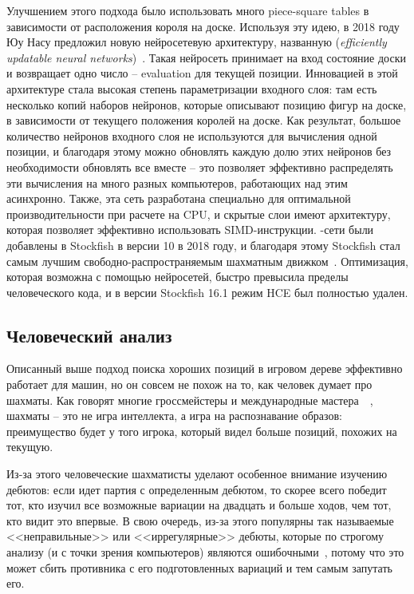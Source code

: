 \documentclass{article}
\begin{document}
Улучшением этого подхода было использовать много piece-square tables
в зависимости от расположения короля на доске. 
Используя эту идею, в 2018 году Юу Насу предложил новую нейросетевую архитектуру,
названную  (\emph{efficiently updatable neural networks})~\cite{nnue-paper}.
Такая нейросеть принимает на вход состояние доски и возвращает одно число -- evaluation
для текущей позиции.
Инновацией в этой архитектуре стала высокая степень параметризации входного слоя:
там есть несколько копий наборов нейронов, которые описывают позицию фигур на доске,
в зависимости от текущего положения королей на доске.
Как результат, большое количество нейронов входного слоя 
не используются для вычисления одной позиции,
и благодаря этому можно обновлять каждую долю этих нейронов без необходимости
обновлять все вместе --
это позволяет эффективно распределять эти вычисления на много разных компьютеров,
работающих над этим асинхронно.
Также, эта сеть разработана специально для оптимальной производительности
при расчете на CPU,
и скрытые слои имеют архитектуру, которая позволяет эффективно использовать SIMD-инструкции.
-сети были добавлены в Stockfish в версии 10 в 2018 году,
и благодаря этому Stockfish стал самым лучшим свободно-распространяемым шахматным движком~\cite{tcec-superfinal}.
Оптимизация, которая возможна с помощью нейросетей, быстро превысила пределы человеческого кода,
и в версии Stockfish 16.1 режим HCE был полностью удален.

\subsection{Человеческий анализ}

Описанный выше подход поиска хороших позиций в игровом дереве
эффективно работает для машин,
но он совсем не похож на то, как человек думает про шахматы.
Как говорят многие гроссмейстеры и международные мастера~\cite{benfinegold-blundering-short}~\cite{gothamchess-patterns},
шахматы -- это не игра интеллекта, а игра на распознавание образов:
преимущество будет у того игрока, который видел больше позиций, похожих на текущую. 

Из-за этого человеческие шахматисты уделают особенное внимание
изучению дебютов: если идет партия с определенным дебютом,
то скорее всего победит тот, кто изучил все возможные вариации на двадцать и больше ходов,
чем тот, кто видит это впервые.
В свою очередь, из-за этого популярны так называемые <<неправильные>> или <<иррегулярные>> дебюты,
которые по строгому анализу (и с точки зрения компьютеров) являются ошибочными~\cite{chessbase-chess-openings},
потому что это может сбить противника с его подготовленных вариаций и тем самым запутать его.
\end{document}
